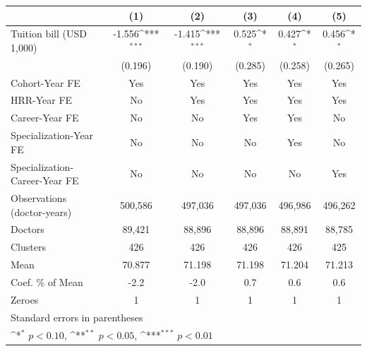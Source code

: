 {
\def\sym#1{\ifmmode^{#1}\else\(^{#1}\)\fi}
\begin{tabular}{l*{5}{c}}
\hline\hline
                    &\multicolumn{1}{c}{(1)}         &\multicolumn{1}{c}{(2)}         &\multicolumn{1}{c}{(3)}         &\multicolumn{1}{c}{(4)}         &\multicolumn{1}{c}{(5)}         \\
\hline
Tuition bill (USD 1,000)&      -1.556\sym{***}&      -1.415\sym{***}&       0.525\sym{*}  &       0.427\sym{*}  &       0.456\sym{*}  \\
                    &     (0.196)         &     (0.190)         &     (0.285)         &     (0.258)         &     (0.265)         \\
[1em]
Cohort-Year FE      &         Yes         &         Yes         &         Yes         &         Yes         &         Yes         \\
[1em]
HRR-Year FE         &          No         &         Yes         &         Yes         &         Yes         &         Yes         \\
[1em]
Career-Year FE      &          No         &          No         &         Yes         &         Yes         &          No         \\
[1em]
Specialization-Year FE&          No         &          No         &          No         &         Yes         &          No         \\
[1em]
Specialization-Career-Year FE&          No         &          No         &          No         &          No         &         Yes         \\
\hline
Observations (doctor-years)&     500,586         &     497,036         &     497,036         &     496,986         &     496,262         \\
Doctors             &      89,421         &      88,896         &      88,896         &      88,891         &      88,785         \\
Clusters            &         426         &         426         &         426         &         426         &         425         \\
Mean                &      70.877         &      71.198         &      71.198         &      71.204         &      71.213         \\
Coef. \% of Mean    &        -2.2         &        -2.0         &         0.7         &         0.6         &         0.6         \\
Zeroes              &           1         &           1         &           1         &           1         &           1         \\
\hline\hline
\multicolumn{6}{l}{\footnotesize Standard errors in parentheses}\\
\multicolumn{6}{l}{\footnotesize \sym{*} \(p<0.10\), \sym{**} \(p<0.05\), \sym{***} \(p<0.01\)}\\
\end{tabular}
}
